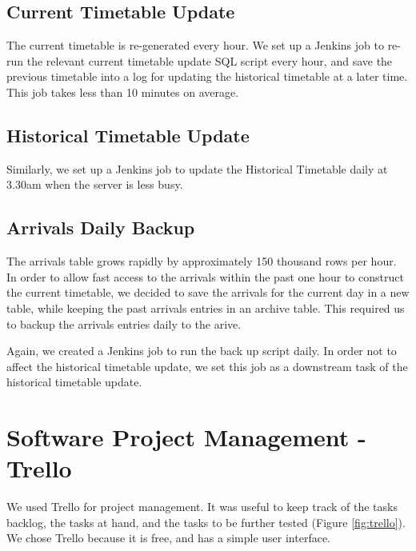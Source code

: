 \subsection{Current Timetable Update}
\par The current timetable is re-generated every hour. We set up a Jenkins job to re-run the relevant current timetable update SQL script every hour, and save the previous timetable into a log for updating the historical timetable at a later time. This job takes less than 10 minutes on average.

\subsection{Historical Timetable Update}
\par Similarly, we set up a Jenkins job to update the Historical Timetable daily at 3.30am when the server is less busy.

\subsection{Arrivals Daily Backup}
\par The arrivals table grows rapidly by approximately 150 thousand rows per hour. In order to allow fast access to the arrivals within the past one hour to construct the current timetable, we decided to save the arrivals for the current day in a new table, while keeping the past arrivals entries in an archive table. This required us to backup the arrivals entries daily to the arive.

\par Again, we created a Jenkins job to run the back up script daily. In order not to affect the historical timetable update, we set this job as a downstream task of the historical timetable update.

\section{Software Project Management - Trello}
\par We used Trello \cite{trello} for project management. It was useful to keep track of the tasks backlog, the tasks at hand, and the tasks to be further tested (Figure \ref{fig:trello}). We chose Trello because it is free, and has a simple user interface.

